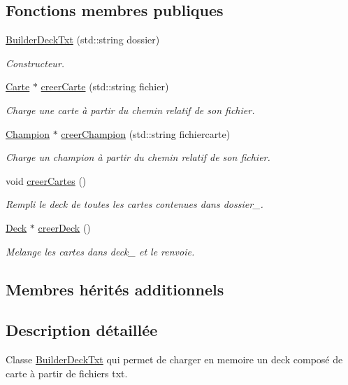 \subsection*{Fonctions membres publiques}
\begin{DoxyCompactItemize}
\item 
\hyperlink{class_builder_deck_txt_add0c11a25020168a94567526a2b3cbfc}{Builder\-Deck\-Txt} (std\-::string dossier)
\begin{DoxyCompactList}\small\item\em Constructeur. \end{DoxyCompactList}\item 
\hyperlink{class_carte}{Carte} $\ast$ \hyperlink{class_builder_deck_txt_acfb3e111a06efeab6ad47a58edd227bb}{creer\-Carte} (std\-::string fichier)
\begin{DoxyCompactList}\small\item\em Charge une carte à partir du chemin relatif de son fichier. \end{DoxyCompactList}\item 
\hyperlink{class_champion}{Champion} $\ast$ \hyperlink{class_builder_deck_txt_a232ac1b449e28f535dc6141eac5bb722}{creer\-Champion} (std\-::string fichiercarte)
\begin{DoxyCompactList}\small\item\em Charge un champion à partir du chemin relatif de son fichier. \end{DoxyCompactList}\item 
void \hyperlink{class_builder_deck_txt_aa4b203ca9600dd92afb07f69d4dd7ec0}{creer\-Cartes} ()
\begin{DoxyCompactList}\small\item\em Rempli le deck de toutes les cartes contenues dans dossier\-\_\-. \end{DoxyCompactList}\item 
\hyperlink{class_deck}{Deck} $\ast$ \hyperlink{class_builder_deck_txt_a5f143e781d9d8a879945f96f770eab9a}{creer\-Deck} ()
\begin{DoxyCompactList}\small\item\em Melange les cartes dans deck\-\_\- et le renvoie. \end{DoxyCompactList}\end{DoxyCompactItemize}
\subsection*{Membres hérités additionnels}


\subsection{Description détaillée}
Classe \hyperlink{class_builder_deck_txt}{Builder\-Deck\-Txt} qui permet de charger en memoire un deck composé de carte à partir de fichiers txt. 

